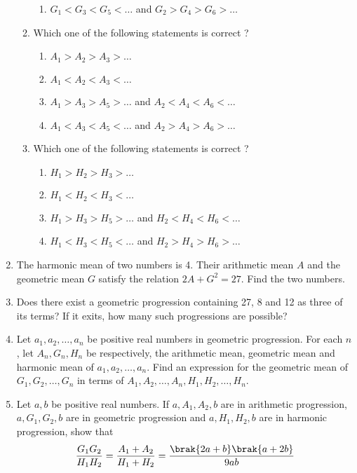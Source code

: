 \begin{enumerate}[label=\thesubsection.\arabic*,ref=\thesubsection.\theenumi]
\begin{enumerate}
\begin{enumerate}
%
\item$G_{1}<G_{3}<G_{5}<\dots$ and $G_{2}>G_{4}>G_{6}>\dots$
\end{enumerate}
%
\item Which one of the following statements is correct ?
\begin{enumerate}    
%    
\item $A_{1}>A_{2}>A_{3}>\dots$ 
%
\item $A_{1}<A_{2}<A_{3}<\dots$
%
\item $A_{1}>A_{3}>A_{5}>\dots$ and $A_{2}<A_{4}<A_{6}<\dots$
%
\item $A_{1}<A_{3}<A_{5}<\dots$ and $A_{2}>A_{4}>A_{6}>\dots$
\end{enumerate}
%
\item Which one of the following statements is correct ?
\begin{enumerate}    
%
	\item $H_{1}>H_{2}>H_{3}>\dots$ 
%
 \item $H_{1}<H_{2}<H_{3}<\dots$
%
\item $H_{1}>H_{3}>H_{5}>\dots$ and $H_{2}<H_{4}<H_{6}<\dots$
%
\item $H_{1}<H_{3}<H_{5}<\dots$ and $H_{2}>H_{4}>H_{6}>\dots$
\end{enumerate}
\end{enumerate}
%
    \item The harmonic mean of two numbers is 4. Their arithmetic mean $A$ and the geometric mean $G$ satisfy the relation
    $2A + G^2 = 27$.
    Find the two numbers.  \hfill{}
    \item Does there exist a geometric progression containing 27,  8 and 12 as three of its terms? If it exits,  how many such progressions are possible?  \hfill{}
      \item Let $ a_{1}, a_{2}, \dots, a_{n} $ be positive real numbers in geometric progression. For each $n$, let $ A_{n}, G_{n}, H_{n} $ be respectively,  the arithmetic mean,  geometric mean and harmonic mean of $ a_{1}, a_{2}, \dots, a_{n}.$ Find an expression for the geometric mean of $ G_{1}, G_{2}, \dots, G_{n} $ in terms of $ A_{1}, A_{2}, \dots, A_{n}, H_{1}, H_{2}, \dots, H_{n}.$ 
%      
	      \hfill {}                              
%       
       \item Let $a, b$ be positive real numbers. If $ a, A_{1}, A_{2}, b $ are in arithmetic progression,  $ a, G_{1}, G_{2}, b $ are in geometric progression and $ a, H_{1}, H_{2}, b $ are in harmonic progression,  show that 
	       $$ \frac{G_{1}G_{2}}{H_{1}H_{2}}=\frac{A_{1}+A_{2}}{H_{1}+H_{2}}=\frac{\brak{2a+b}\brak{a+2b}}{9ab} $$ 

\end{enumerate}
